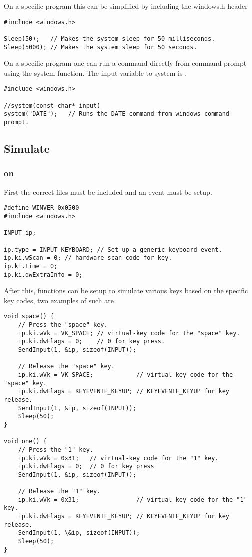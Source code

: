 On a  specific program this can be simplified by including the windows.h header
\begin{lstlisting}
#include <windows.h>

Sleep(50);   // Makes the system sleep for 50 milliseconds.
Sleep(5000); // Makes the system sleep for 50 seconds.
\end{lstlisting}


On a  specific program one can run a command directly from command prompt using the system function. The input variable to system is .
\begin{lstlisting}
#include <windows.h>

//system(const char* input)
system("DATE");   // Runs the DATE command from windows command prompt.
\end{lstlisting}










\subsection{Simulate }

\subsubsection{ on }

First the correct files must be included and an event must be setup.
\begin{lstlisting}
#define WINVER 0x0500
#include <windows.h> 

INPUT ip;

ip.type = INPUT_KEYBOARD; // Set up a generic keyboard event.
ip.ki.wScan = 0; // hardware scan code for key.
ip.ki.time = 0;
ip.ki.dwExtraInfo = 0;
\end{lstlisting}

After this, functions can be setup to simulate various keys based on the specific key codes, two examples of such are
\begin{lstlisting}
void space() { 
	// Press the "space" key.
	ip.ki.wVk = VK_SPACE; // virtual-key code for the "space" key.
	ip.ki.dwFlags = 0;    // 0 for key press.
	SendInput(1, &ip, sizeof(INPUT));
	
	// Release the "space" key.
	ip.ki.wVk = VK_SPACE;            // virtual-key code for the "space" key.
	ip.ki.dwFlags = KEYEVENTF_KEYUP; // KEYEVENTF_KEYUP for key release.
	SendInput(1, &ip, sizeof(INPUT));
	Sleep(50);
}

void one() { 
	// Press the "1" key.
	ip.ki.wVk = 0x31;   // virtual-key code for the "1" key.                                          
	ip.ki.dwFlags = 0;  // 0 for key press
	SendInput(1, &ip, sizeof(INPUT));
	
	// Release the "1" key.
	ip.ki.wVk = 0x31;                // virtual-key code for the "1" key.
	ip.ki.dwFlags = KEYEVENTF_KEYUP; // KEYEVENTF_KEYUP for key release.
	SendInput(1, \&ip, sizeof(INPUT));
	Sleep(50);
}
\end{lstlisting}

